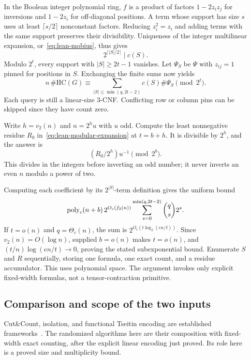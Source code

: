 In the Boolean integer polynomial ring, $f$ is a product of factors
$1-2z_iz_j$ for inversions and $1-2z_i$ for off-diagonal positions.
A term whose support has size $s$ uses at least $\lceil s/2\rceil$
nonconstant factors. Reducing $z_i^2=z_i$ and adding terms with the
same support preserves their divisibility. Uniqueness of the integer
multilinear expansion, or~\eqref{eq:lean-mobius}, thus gives
\[
 2^{\lceil|S|/2\rceil}\mid c(S).
\]
Modulo $2^t$, every support with $|S|\ge2t-1$ vanishes. Let
$\Psi_S$ be $\Psi$ with $z_{ij}=1$ pinned for positions in $S$.
Exchanging the finite sums now yields
\begin{equation}\label{eq:lean-modular-expansion}
 n\,\#\mathrm{HC}(G)\equiv
 \sum_{|S|\le\min(q,2t-2)}c(S)\#\Psi_S\pmod{2^t}.
\end{equation}
Each query is still a linear-size 3-CNF. Conflicting row or column
pins can be skipped since they have count zero.

Write $h=v_2(n)$ and $n=2^hu$ with $u$ odd. Compute the least
nonnegative residue $R_0$ in~\eqref{eq:lean-modular-expansion} at
$t=b+h$. It is divisible by $2^h$, and the answer is
\[
 (R_0/2^h)u^{-1}\pmod{2^b}.
\]
This divides in the integers before inverting an odd number;
it never inverts an even $n$ modulo a power of two.

Computing each coefficient by its $2^{|S|}$-term definition gives
the uniform bound
\[
 \operatorname{poly}_c(n+b)\,2^{O_c(f_2(n))}
 \sum_{s=0}^{\min(q,2t-2)}\binom qs2^s.
\]
If $t=o(n)$ and $q=\Theta_c(n)$, the sum is
$2^{O_c(t\log_2(en/t))}$. Since $v_2(n)=O(\log n)$, supplied
$b=o(n)$ makes $t=o(n)$, and
$(t/n)\log(en/t)\to0$, proving the stated subexponential bound.
Enumerate $S$ and $R$ sequentially, storing one formula, one exact
count, and a residue accumulator. This uses polynomial space.
The argument invokes only explicit fixed-width formulas, not a
tensor-contraction primitive.

\subsection{Comparison and scope of the two inputs}

Cut\&Count, isolation, and functional Tseitin encoding are established
frameworks~\cite{CutCount11}. The randomized algorithms here are their
composition with fixed-width exact counting, after the explicit linear
encoding just proved. Its role here is a proved size and
multiplicity bound.

